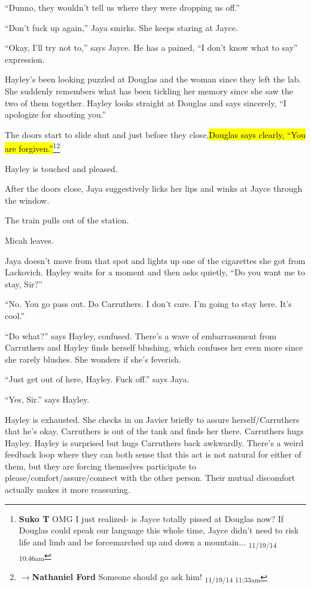 ``Dunno, they wouldn't tell us where they were dropping us off.''

``Don't fuck up again,'' Jaya smirks.  She keeps staring at Jayce.

``Okay, I'll try not to,'' says Jayce.  He has a pained, ``I don't know what to say'' expression.



Hayley's been looking puzzled at Douglas and the woman since they left the lab.  She suddenly remembers what has been tickling her memory since she saw the two of them together.  Hayley looks straight at Douglas and says sincerely, ``I apologize for shooting you.''

The doors start to slide shut and just before they close,\hl{Douglas says clearly, ``You are forgiven.''}\footnote{\textbf{Suko T }OMG I just realized- is Jayce totally pissed at Douglas now?  If Douglas could speak our language this whole time, Jayce didn't need to risk life and limb and be forcemarched up and down a mountain... \textsubscript{11/19/14 10:46am}}\footnote{$\rightarrow$\textbf{Nathaniel Ford }Someone should go ask him! \textsubscript{11/19/14 11:33am}}

Hayley is touched and pleased.  

After the doors close, Jaya suggestively licks her lips and winks at Jayce through the window.

The train pulls out of the station.



Micah leaves.

Jaya doesn't move from that spot and lights up one of the cigarettes she got from Lackovich. Hayley waits for a moment and then asks quietly, ``Do you want me to stay, Sir?''

``No.  You go pass out.  Do Carruthers.  I don't care.  I'm going to stay here.  It's cool.''

``Do what?'' says Hayley, confused. There's a wave of embarrassment from Carruthers and Hayley finds herself blushing, which confuses her even more since she rarely blushes.  She wonders if she's feverish.

``Just get out of here, Hayley.  Fuck off.'' says Jaya.

``Yes, Sir.'' says Hayley.



Hayley is exhausted.  She checks in on Javier briefly to assure herself/Carruthers that he's okay.  Carruthers is out of the tank and finds her there.  Carruthers hugs Hayley.  Hayley is surprised but hugs Carruthers back awkwardly.  There's a weird feedback loop where they can both sense that this act is not natural for either of them, but they are forcing themselves participate to please/comfort/assure/connect with the other person.  Their mutual discomfort actually makes it more reassuring.



